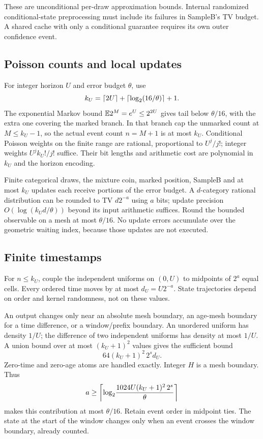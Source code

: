 These are unconditional per-draw approximation bounds. Internal randomized conditional-state preprocessing must include its failures in SampleB's TV budget. A shared cache with only a conditional guarantee requires its own outer confidence event.

\subsection{Poisson counts and local updates}
For integer horizon $U$ and error budget $\theta$, use
\[
k_U=\left\lceil2U\right\rceil+\left\lceil\log_2(16/\theta)\right\rceil+1.
\]
The exponential Markov bound $\mathbb E2^M=e^U\le2^{2U}$ gives tail below $\theta/16$, with the extra one covering the marked branch. In that branch cap the unmarked count at $M\le k_U-1$, so the actual event count $n=M+1$ is at most $k_U$. Conditional Poisson weights on the finite range are rational, proportional to $U^j/j!$; integer weights $U^j k_U!/j!$ suffice. Their bit lengths and arithmetic cost are polynomial in $k_U$ and the horizon encoding.

Finite categorical draws, the mixture coin, marked position, SampleB and at most $k_U$ updates each receive portions of the error budget. A $d$-category rational distribution can be rounded to TV $d2^{-a}$ using $a$ bits; update precision $O(\log(k_Ud/\theta))$ beyond its input arithmetic suffices. Round the bounded observable on a mesh at most $\theta/16$. No update errors accumulate over the geometric waiting index, because those updates are not executed.

\subsection{Finite timestamps}
For $n\le k_U$, couple the independent uniforms on $(0,U)$ to midpoints of $2^a$ equal cells. Every ordered time moves by at most $d_U=U2^{-a}$. State trajectories depend on order and kernel randomness, not on these values.

An output changes only near an absolute mesh boundary, an age-mesh boundary for a time difference, or a window/prefix boundary. An unordered uniform has density $1/U$; the difference of two independent uniforms has density at most $1/U$. A union bound over at most $(k_U+1)^2$ values gives the sufficient bound
\[
64(k_U+1)^2\,2^s d_U.
\]
Zero-time and zero-age atoms are handled exactly. Integer $H$ is a mesh boundary. Thus
\[
a\ge\left\lceil\log_2\!\frac{1024U(k_U+1)^2\,2^s}{\theta}\right\rceil
\]
makes this contribution at most $\theta/16$. Retain event order in midpoint ties. The state at the start of the window changes only when an event crosses the window boundary, already counted.

